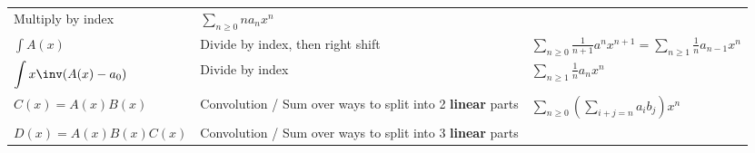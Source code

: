 \begin{longtable}[]{@{}lll@{}}
\begin{minipage}[t]{0.30\columnwidth}
Multiply by index\strut
\end{minipage} & \begin{minipage}[t]{0.30\columnwidth}\raggedright
\(\displaystyle\sum_{n\geq 0}n a_n x^n\)\strut
\end{minipage}\tabularnewline
\begin{minipage}[t]{0.30\columnwidth}\raggedright
\(\displaystyle\int A(x)\)\strut
\end{minipage} & \begin{minipage}[t]{0.30\columnwidth}\raggedright
Divide by index, then right shift\strut
\end{minipage} & \begin{minipage}[t]{0.30\columnwidth}\raggedright
\(\displaystyle\sum_{n\geq 0}\frac 1 {n+1} a^{n}x^{n+1} = \displaystyle\sum_{n\geq 1}\frac 1 n a_{n-1} x^{n}\)\strut
\end{minipage}\tabularnewline
\begin{minipage}[t]{0.30\columnwidth}\raggedright
\(\displaystyle\int x\inv(A(x) - a_0)\)\strut
\end{minipage} & \begin{minipage}[t]{0.30\columnwidth}\raggedright
Divide by index\strut
\end{minipage} & \begin{minipage}[t]{0.30\columnwidth}\raggedright
\(\displaystyle\sum_{n\geq 1} \frac{1}{n} a_n x^n\)\strut
\end{minipage}\tabularnewline
\begin{minipage}[t]{0.30\columnwidth}\raggedright
\(C(x) = A(x)B(x)\)\strut
\end{minipage} & \begin{minipage}[t]{0.30\columnwidth}\raggedright
Convolution / Sum over ways to split into 2 \textbf{linear} parts\strut
\end{minipage} & \begin{minipage}[t]{0.30\columnwidth}\raggedright
\(\displaystyle\sum_{n\geq 0} \left( \displaystyle\sum_{i+j=n} a_i b_j\right)x^n\)\strut
\end{minipage}\tabularnewline
\begin{minipage}[t]{0.30\columnwidth}\raggedright
\(D(x) = A(x)B(x)C(x)\)\strut
\end{minipage} & \begin{minipage}[t]{0.30\columnwidth}\raggedright
Convolution / Sum over ways to split into 3 \textbf{linear} parts\strut
\end{minipage} & \begin{minipage}[t]{0.30\columnwidth}\raggedright

\end{minipage}
\end{longtable}
